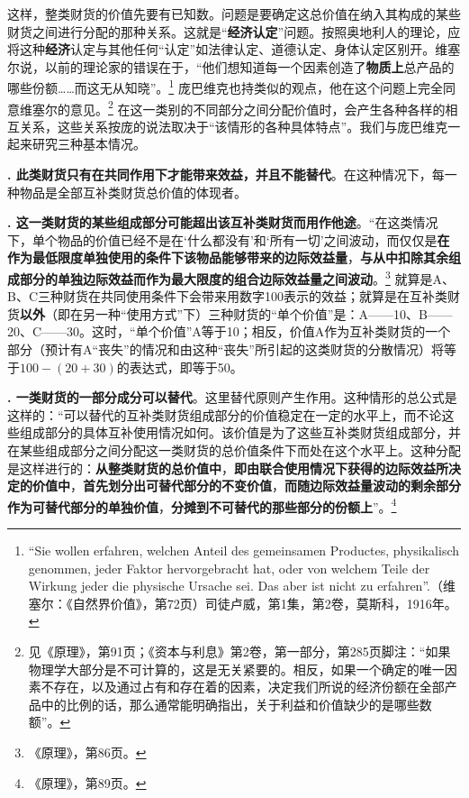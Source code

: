 \documentclass[fontset=fandol, a4paper, 12pt, openright]{ctexbook}
\newcommand{\RN}[1]{%
  \textup{\uppercase\expandafter{\romannumeral#1}}%
}
\begin{document}
这样，整类财货的价值先要有已知数。问题是要确定这总价值在纳入其构成的某些财货之间进行分配的那种关系。这就是“\textbf{经济认定}”问题。按照奥地利人的理论，应将这种\textbf{经济}认定与其他任何“认定”如法律认定、道德认定、身体认定区别开。维塞尔说，以前的理论家的错误在于，“他们想知道每一个因素创造了\textbf{物质上}总产品的哪些份额……而这无从知晓”。\footnote{``Sie wollen erfahren, welchen Anteil des gemeinsamen Productes, physikalisch genommen, jeder Faktor hervorgebracht hat, oder von welchem Teile der Wirkung jeder die physische Ursache sei. Das aber ist nicht zu erfahren''.（维塞尔：《自然界价值》，第72页）司徒卢威，第1集，第2卷，莫斯科，1916年。} 庞巴维克也持类似的观点，他在这个问题上完全同意维塞尔的意见。\footnote{见《原理》，第91页；《资本与利息》第2卷，第一部分，第285页脚注：“如果物理学大部分是不可计算的，这是无关紧要的。相反，如果一个确定的唯一因素不存在，以及通过占有和存在着的因素，决定我们所说的经济份额在全部产品中的比例的话，那么通常能明确指出，关于利益和价值缺少的是哪些数额”。} 在这一类别的不同部分之间分配价值时，会产生各种各样的相互关系，这些关系按庞的说法取决于“该情形的各种具体特点”。我们与庞巴维克一起来研究三种基本情况。

\textbf{\RN{1}. 此类财货只有在共同作用下才能带来效益，并且不能替代}。在这种情况下，每一种物品是全部互补类财货总价值的体现者。

\textbf{\RN{2}. 这一类财货的某些组成部分可能超出该互补类财货而用作他途}。“在这类情况下，单个物品的价值已经不是在‘什么都没有’和‘所有一切’之间波动，而仅仅是\textbf{在作为最低限度单独使用的条件下该物品能够带来的边际效益量}，\textbf{与从中扣除其余组成部分的单独边际效益而作为最大限度的组合边际效益量之间波动}。\footnote{《原理》，第86页。} 就算是A、B、C三种财货在共同使用条件下会带来用数字100表示的效益；就算是在互补类财货\textbf{以外}（即在另一种“使用方式”下）三种财货的“单个价值”是：A——10、B——20、C——30。这时，“单个价值”A等于10；相反，价值A作为互补类财货的一个部分（预计有A“丧失”的情况和由这种“丧失”所引起的这类财货的分散情况）将等于$100-(20+30)$的表达式，即等于50。

\textbf{\RN{3}. 一类财货的一部分成分可以替代}。这里替代原则产生作用。这种情形的总公式是这样的：“可以替代的互补类财货组成部分的价值稳定在一定的水平上，而不论这些组成部分的具体互补使用情况如何。该价值是为了这些互补类财货组成部分，并在某些组成部分之间分配这一类财货的总价值条件下而处在这个水平上。这种分配是这样进行的：\textbf{从整类财货的总价值中}，\textbf{即由联合使用情况下获得的边际效益所决定的价值中}，\textbf{首先划分出可替代部分的不变价值}，\textbf{而随边际效益量波动的剩余部分作为可替代部分的单独价值}，\textbf{分摊到不可替代的那些部分的份额上}”。\footnote{《原理》，第89页。}
\end{document}
